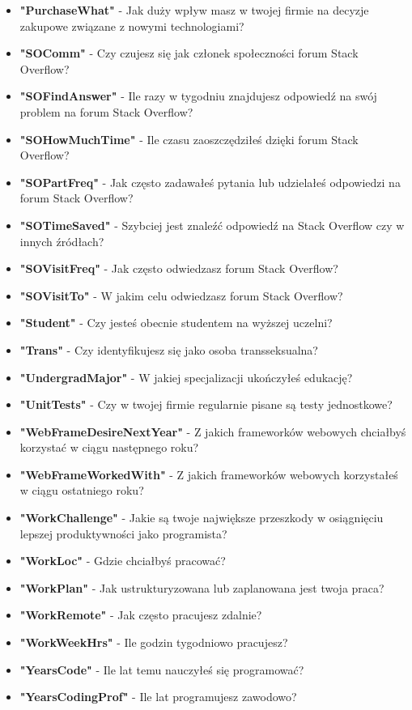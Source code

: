 \begin{appendices}
\begin{itemize}
        \item \textbf{"PurchaseWhat"} - Jak duży wpływ masz w twojej firmie na decyzje zakupowe związane z nowymi technologiami?
        \item \textbf{"SOComm"} - Czy czujesz się jak członek społeczności forum Stack Overflow?
        \item \textbf{"SOFindAnswer"} - Ile razy w tygodniu znajdujesz odpowiedź na swój problem na forum Stack Overflow?
        \item \textbf{"SOHowMuchTime"} - Ile czasu zaoszczędziłeś dzięki forum Stack Overflow?
        \item \textbf{"SOPartFreq"} - Jak często zadawałeś pytania lub udzielałeś odpowiedzi na forum Stack Overflow?
        \item \textbf{"SOTimeSaved"} - Szybciej jest znaleźć odpowiedź na Stack Overflow czy w innych źródłach?
        \item \textbf{"SOVisitFreq"} - Jak często odwiedzasz forum Stack Overflow?
        \item \textbf{"SOVisitTo"} - W jakim celu odwiedzasz forum Stack Overflow?
        \item \textbf{"Student"} - Czy jesteś obecnie studentem na wyższej uczelni?
        \item \textbf{"Trans"} - Czy identyfikujesz się jako osoba transseksualna?
        \item \textbf{"UndergradMajor"} - W jakiej specjalizacji ukończyłeś edukację?
        \item \textbf{"UnitTests"} - Czy w twojej firmie regularnie pisane są testy jednostkowe?
        \item \textbf{"WebFrameDesireNextYear"} - Z jakich frameworków webowych chciałbyś korzystać w ciągu następnego roku?
        \item \textbf{"WebFrameWorkedWith"} - Z jakich frameworków webowych korzystałeś w ciągu ostatniego roku?
        \item \textbf{"WorkChallenge"} - Jakie są twoje największe przeszkody w osiągnięciu lepszej produktywności jako programista?
        \item \textbf{"WorkLoc"} - Gdzie chciałbyś pracować?
        \item \textbf{"WorkPlan"} - Jak ustrukturyzowana lub zaplanowana jest twoja praca?
        \item \textbf{"WorkRemote"} - Jak często pracujesz zdalnie?
        \item \textbf{"WorkWeekHrs"} - Ile godzin tygodniowo pracujesz?
        \item \textbf{"YearsCode"} - Ile lat temu nauczyłeś się programować?
        \item \textbf{"YearsCodingProf"} - Ile lat programujesz zawodowo?
    \end{itemize}
\end{appendices}
\thispagestyle{normal}
